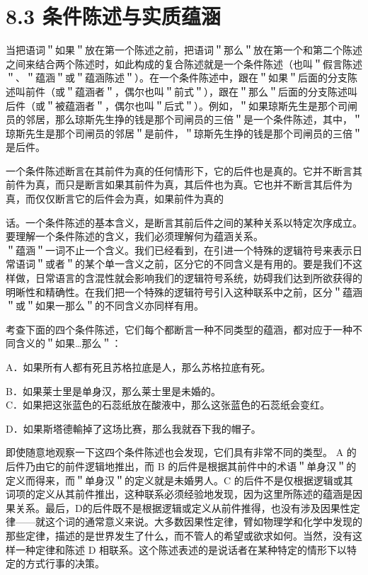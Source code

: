 \section*{8.3 条件陈述与实质蕴涵}
当把语词＂如果＂放在第一个陈述之前，把语词＂那么＂放在第一个和第二个陈述之间来结合两个陈述时，如此构成的复合陈述就是一个条件陈述（也叫＂假言陈述＂、＂蕴涵＂或＂蕴涵陈述＂）。在一个条件陈述中，跟在＂如果＂后面的分支陈述叫前件（或＂蕴涵者＂，偶尔也叫＂前式＂），跟在＂那么＂后面的分支陈述叫后件（或＂被蕴涵者＂，偶尔也叫＂后式＂）。例如，＂如果琼斯先生是那个司闸员的邻居，那么琼斯先生挣的钱是那个司闸员的三倍＂是一个条件陈述，其中，＂琼斯先生是那个司闸员的邻居＂是前件，＂琼斯先生挣的钱是那个司闸员的三倍＂是后件。

一个条件陈述断言在其前件为真的任何情形下，它的后件也是真的。它并不断言其前件为真，而只是断言如果其前件为真，其后件也为真。它也并不断言其后件为真，而仅仅断言它的后件会为真，如果前件为真的

话。一个条件陈述的基本含义，是断言其前后件之间的某种关系以特定次序成立。要理解一个条件陈述的含义，我们必须理解何为蕴涵关系。\\
＂蕴涵＂一词不止一个含义。我们已经看到，在引进一个特殊的逻辑符号来表示日常语词＂或者＂的某个单一含义之前，区分它的不同含义是有用的。要是我们不这样做，日常语言的含混性就会影响我们的逻辑符号系统，妨碍我们达到所欲获得的明晰性和精确性。在我们把一个特殊的逻辑符号引入这种联系中之前，区分＂蕴涵＂或＂如果一那么＂的不同含义亦同样有用。

考查下面的四个条件陈述，它们每个都断言一种不同类型的蕴涵，都对应于一种不同含义的＂如果…那么＂：

A．如果所有人都有死且苏格拉底是人，那么苏格拉底有死。

B．如果莱士里是单身汉，那么莱士里是未婚的。\\
C．如果把这张蓝色的石蕊纸放在酸液中，那么这张蓝色的石蕊纸会变红。

D．如果斯塔德輸掉了这场比赛，那么我就吞下我的帽子。

即使随意地观察一下这四个条件陈述也会发现，它们具有非常不同的类型。 A 的后件乃由它的前件逻辑地推出，而 B 的后件是根据其前件中的术语＂单身汉＂的定义而得来，而＂单身汉＂的定义就是未婚男人。C 的后件不是仅根据逻辑或其词项的定义从其前件推出，这种联系必须经验地发现，因为这里所陈述的蕴涵是因果关系。最后，D的后件既不是根据逻辑或定义从前件推得，也没有涉及因果性定律——就这个词的通常意义来说。大多数因果性定律，臂如物理学和化学中发现的那些定律，描述的是世界发生了什么，而不管人的希望或欲求如何。当然，没有这样一种定律和陈述 D 相联系。这个陈述表述的是说话者在某种特定的情形下以特定的方式行事的决策。

